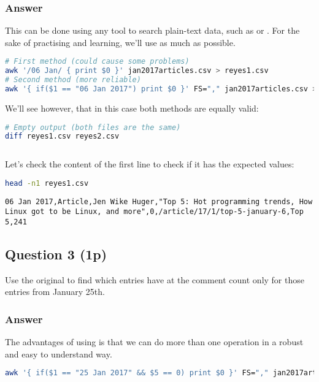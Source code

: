 \subsubsection*{Answer}
This can be done using any tool to search plain-text data, such as  or . For the sake of practising and learning, we'll use  as much as possible.

\begin{lstlisting}[language=bash]
# First method (could cause some problems)
awk '/06 Jan/ { print $0 }' jan2017articles.csv > reyes1.csv
# Second method (more reliable)
awk '{ if($1 == "06 Jan 2017") print $0 }' FS="," jan2017articles.csv > reyes2.csv
\end{lstlisting}

We'll see however, that in this case both methods are equally valid:
\begin{lstlisting}[language=bash]
# Empty output (both files are the same)
diff reyes1.csv reyes2.csv
\end{lstlisting}

\begin{lstlisting}[style=output, showlines=true]

\end{lstlisting}

Let's check the content of the first line to check if it has the expected values:
\begin{lstlisting}[language=bash]
head -n1 reyes1.csv
\end{lstlisting}

\begin{lstlisting}[style=output]
06 Jan 2017,Article,Jen Wike Huger,"Top 5: Hot programming trends, How Linux got to be Linux, and more",0,/article/17/1/top-5-january-6,Top 5,241
\end{lstlisting}

\subsection*{Question 3 (1p)}
Use the original  to find which entries have  at the comment count only for those entries from January 25th.

\subsubsection*{Answer}
The advantages of using  is that we can do more than one operation in a robust and easy to understand way.
\begin{lstlisting}[language=bash]
awk '{ if($1 == "25 Jan 2017" && $5 == 0) print $0 }' FS="," jan2017articles.csv
\end{lstlisting}

